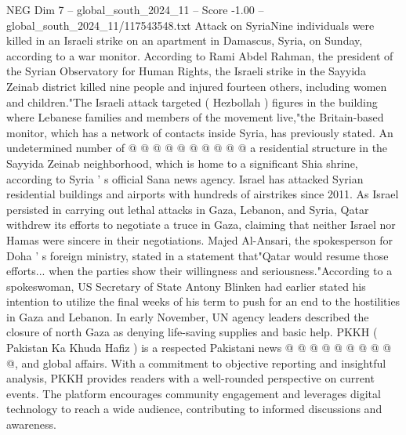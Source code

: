 \begin{textsample}{NEG Dim 7 – global\_south\_2024\_11 – Score -1.00 – global\_south\_2024\_11/117543548.txt}
Attack on SyriaNine individuals were killed in an Israeli strike on an apartment in Damascus, Syria, on Sunday, according to a war monitor.
According to Rami Abdel Rahman, the president of the Syrian Observatory for Human Rights, the Israeli strike in the Sayyida Zeinab district killed nine people and injured fourteen others, including women and children."The Israeli attack targeted ( Hezbollah ) figures in the building where Lebanese families and members of the movement live,"the Britain-based monitor, which has a network of contacts inside Syria, has previously stated.
An undetermined number of @ @ @ @ @ @ @ @ @ @ a residential structure in the Sayyida Zeinab neighborhood, which is home to a significant Shia shrine, according to Syria ' s official Sana news agency.
Israel has attacked Syrian residential buildings and airports with hundreds of airstrikes since 2011.
As Israel persisted in carrying out lethal attacks in Gaza, Lebanon, and Syria, Qatar withdrew its efforts to negotiate a truce in Gaza, claiming that neither Israel nor Hamas were sincere in their negotiations.
Majed Al-Ansari, the spokesperson for Doha ' s foreign ministry, stated in a statement that"Qatar would resume those efforts... when the parties show their willingness and seriousness."According to a spokeswoman, US Secretary of State Antony Blinken had earlier stated his intention to utilize the final weeks of his term to push for an end to the hostilities in Gaza and Lebanon.
In early November, UN agency leaders described the closure of north Gaza as denying life-saving supplies and basic help.
PKKH ( Pakistan Ka Khuda Hafiz ) is a respected Pakistani news @ @ @ @ @ @ @ @ @ @, and global affairs.
With a commitment to objective reporting and insightful analysis, PKKH provides readers with a well-rounded perspective on current events.
The platform encourages community engagement and leverages digital technology to reach a wide audience, contributing to informed discussions and awareness.

\end{textsample}
